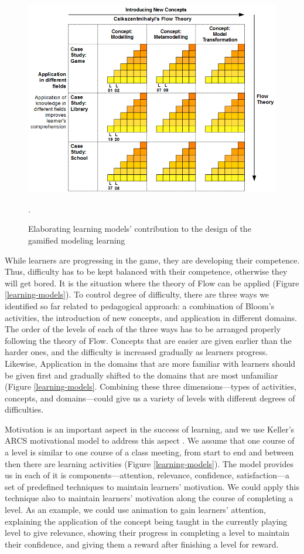 \documentclass[12pt, a4paper]{report}
\begin{document}
{\begin{figure}[ht]
\centering
\includegraphics[width=\textwidth]{learning-models2}
\caption{Elaborating learning models' contribution to the design of the gamified modeling learning}.
\label{learning-models2}
\end{figure}

While learners are progressing in the game, they are developing their competence. Thus, difficulty has to be kept balanced with their competence, otherwise they will get bored. It is the situation where the theory of Flow can be applied (Figure \ref{learning-models}). To control degree of difficulty, there are three ways we identified so far related to pedagogical approach: a combination of Bloom's activities, the introduction of new concepts, and application in different domains. The order of the levels of each of the three ways has to be arranged properly following the theory of Flow. Concepts that are easier are given earlier than the harder ones, and the difficulty is increased gradually as learners progress. Likewise, Application in the domains that are more familiar with learners should be given first and gradually shifted to the domains that are most unfamiliar (Figure \ref{learning-models}. Combining these three dimensions---types of activities, concepts, and domains---could give us a variety of levels with different degrees of difficulties.

Motivation is an important aspect in the success of learning, and we use Keller's ARCS motivational model to address this aspect \cite{keller2010motivational}. We assume that one course of a level is similar to one course of a class meeting, from start to end and between then there are learning activities (Figure \ref{learning-models}). The model provides us in each of it is components---attention, relevance, confidence, satisfaction---a set of predefined techniques to maintain learners' motivation. We could apply this technique also to maintain learners' motivation along the course of completing a level. As an example, we could use animation to gain learners' attention, explaining the application of the concept being taught in the currently playing level to give relevance, showing their progress in completing a level to maintain their confidence, and giving them a reward after finishing a level for reward.
 
}
\end{document}
